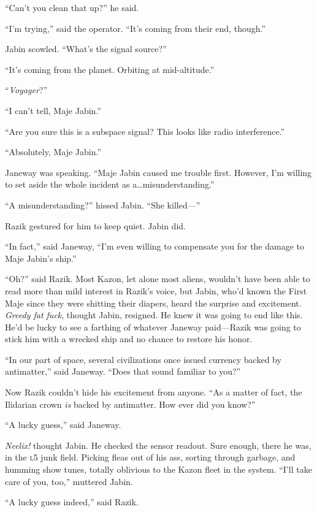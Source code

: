 \documentclass[twoside,letterpaper,12pt]{memoir}
\begin{document}
``Can't you clean that up?'' he said.

``I'm trying,'' said the operator. ``It's coming from their end, though.''

Jabin scowled. ``What's the signal source?''

``It's coming from the planet. Orbiting at mid-altitude.''

``\textit{Voyager}?''

``I can't tell, Maje Jabin.''

``Are you sure this is a subspace signal? This looks like radio interference.''

``Absolutely, Maje Jabin.''

Janeway was speaking. ``Maje Jabin caused me trouble first. However, I'm willing to set aside the whole incident as a\ldots misunderstanding.''

``A misunderstanding?'' hissed Jabin. ``She killed---''

Razik gestured for him to keep quiet. Jabin did.

``In fact,'' said Janeway, ``I'm even willing to compensate you for the damage to Maje Jabin's ship.''

``Oh?'' said Razik. Most Kazon, let alone most aliens, wouldn't have been able to read more than mild interest in Razik's voice, but Jabin, who'd known the First Maje since they were shitting their diapers, heard the surprise and excitement. \textit{Greedy fat fuck}, thought Jabin, resigned. He knew it was going to end like this. He'd be lucky to see a farthing of whatever Janeway paid---Razik was going to stick him with a wrecked ship and no chance to restore his honor.

``In our part of space, several civilizations once issued currency backed by antimatter,'' said Janeway. ``Does that sound familiar to you?''

Now Razik couldn't hide his excitement from anyone. ``As a matter of fact, the Ilidarian crown \textit{is} backed by antimatter. How ever did you know?''

``A lucky guess,'' said Janeway.

\textit{Neelix!} thought Jabin. He checked the sensor readout. Sure enough, there he was, in the \textsc{l5} junk field. Picking fleas out of his ass, sorting through garbage, and humming show tunes, totally oblivious to the Kazon fleet in the system. ``I'll take care of you, too,'' muttered Jabin.

``A lucky guess indeed,'' said Razik.
\end{document}
